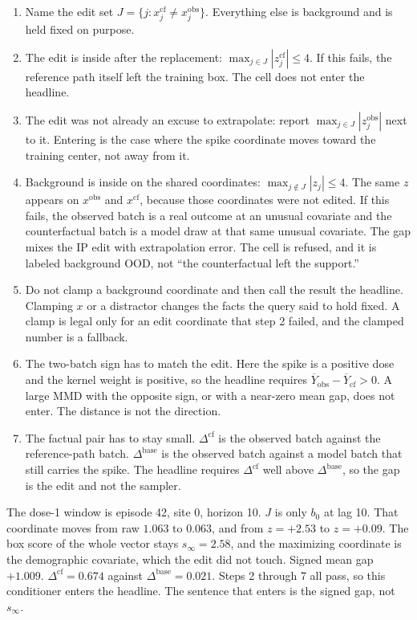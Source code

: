 \documentclass[11pt]{article}
\begin{document}
\begin{enumerate}
\item Name the edit set $J=\{j:x^{\mathrm{cf}}_{j}\ne x^{\mathrm{obs}}_{j}\}$.
Everything else is background and is held fixed on purpose.
\item The edit is inside after the replacement: $\max_{j\in J}|z^{\mathrm{cf}}_{j}|\le 4$.
If this fails, the reference path itself left the training box.
The cell does not enter the headline.
\item The edit was not already an excuse to extrapolate: report $\max_{j\in J}|z^{\mathrm{obs}}_{j}|$ next to it.
Entering is the case where the spike coordinate moves toward the training center, not away from it.
\item Background is inside on the shared coordinates: $\max_{j\notin J}|z_{j}|\le 4$.
The same $z$ appears on $x^{\mathrm{obs}}$ and $x^{\mathrm{cf}}$, because those coordinates were not edited.
If this fails, the observed batch is a real outcome at an unusual covariate and the counterfactual batch is a model draw at that same unusual covariate.
The gap mixes the IP edit with extrapolation error.
The cell is refused, and it is labeled background OOD, not ``the counterfactual left the support.''
\item Do not clamp a background coordinate and then call the result the headline.
Clamping $x$ or a distractor changes the facts the query said to hold fixed.
A clamp is legal only for an edit coordinate that step 2 failed, and the clamped number is a fallback.
\item The two-batch sign has to match the edit.
Here the spike is a positive dose and the kernel weight is positive, so the headline requires $\overline{Y}_{\mathrm{obs}}-\overline{Y}_{\mathrm{cf}}>0$.
A large MMD with the opposite sign, or with a near-zero mean gap, does not enter.
The distance is not the direction.
\item The factual pair has to stay small.
$\Delta^{\mathrm{cf}}$ is the observed batch against the reference-path batch.
$\Delta^{\mathrm{base}}$ is the observed batch against a model batch that still carries the spike.
The headline requires $\Delta^{\mathrm{cf}}$ well above $\Delta^{\mathrm{base}}$, so the gap is the edit and not the sampler.
\end{enumerate}

The dose-1 window is episode 42, site 0, horizon 10.
$J$ is only $b_{0}$ at lag 10.
That coordinate moves from raw $1.063$ to $0.063$, and from $z=+2.53$ to $z=+0.09$.
The box score of the whole vector stays $s_{\infty}=2.58$, and the maximizing coordinate is the demographic covariate, which the edit did not touch.
Signed mean gap $+1.009$.
$\Delta^{\mathrm{cf}}=0.674$ against $\Delta^{\mathrm{base}}=0.021$.
Steps 2 through 7 all pass, so this conditioner enters the headline.
The sentence that enters is the signed gap, not $s_{\infty}$.
\end{document}

